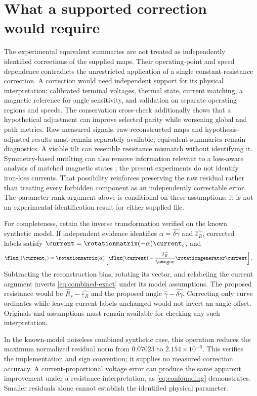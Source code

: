 \section{What a supported correction would require}
The experimental equivalent summaries are not treated as independently
identified corrections of the supplied maps. Their operating-point and speed
dependence contradicts the unrestricted
application of a single constant-resistance correction. A correction would
need independent support for its physical interpretation: calibrated terminal
voltages, thermal state, current matching, a magnetic reference for angle
sensitivity, and validation on separate operating regions and speeds.
The conservation cross-check additionally shows that a hypothetical adjustment
can improve selected parity while worsening global and path metrics.
Raw measured signals, raw reconstructed maps and hypothesis-adjusted results
must remain separately available; equivalent summaries remain diagnostics.
A visible tilt can resemble resistance mismatch without identifying it.
Symmetry-based untilting can also remove information relevant to a loss-aware
analysis of matched magnetic states \cite{companion-coenergy}; the present
experiments do not identify iron-loss currents. That possibility reinforces
preserving the raw residual rather than treating every forbidden component
as an independently correctable error.
The parameter-rank argument above is conditional on these assumptions; it is
not an experimental identification result for either supplied file.

For completeness, retain the inverse transformation verified on the known
synthetic model. If independent evidence identifies
$\alpha=\widehat{\delta\gamma}$ and $\widehat{\varepsilon_R}$, corrected labels
satisfy $\hat\current=\rotationmatrix(-\alpha)\current_c$, and
\begin{equation}
 \flux_c(\current_c)=\rotationmatrix(\alpha)
 \left[\hat\flux(\hat\current)
 -\frac{\widehat{\varepsilon_R}}{\omegae}\rotationgenerator\hat\current\right].
 \label{eq:corrected-map}
\end{equation}
Subtracting the reconstruction bias, rotating its vector, and relabeling the
current argument inverts \cref{eq:combined-exact} under its model assumptions.
The proposed resistance would be $\hat R_s-\widehat{\varepsilon_R}$ and the
proposed angle $\hat\gamma-\widehat{\delta\gamma}$. Correcting only curve
ordinates while leaving current labels unchanged would not invert an angle
offset. Originals and assumptions must remain available for checking any
such interpretation.

In the known-model noiseless combined synthetic case, this operation reduces
the maximum normalized residual norm from $0.07023$ to
$2.154\times10^{-6}$. This verifies the implementation and sign convention;
it supplies no measured correction accuracy. A current-proportional voltage
error can produce the same apparent improvement under a resistance
interpretation, as \cref{eq:confounding} demonstrates. Smaller residuals alone
cannot establish the identified physical parameter.
